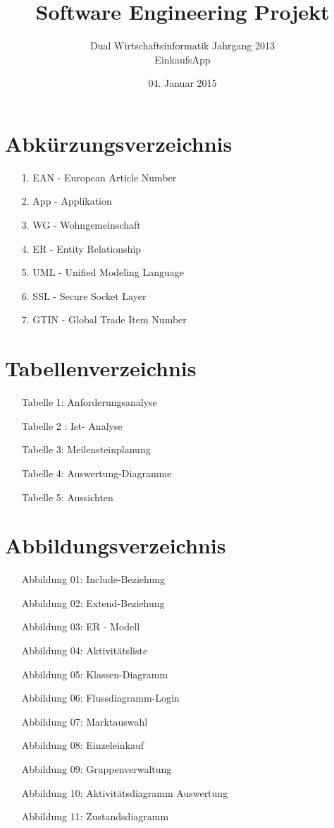 \documentclass[12pt,a4paper]{article}
\begin{document}
\title{Software Engineering Projekt}
\author{Dual Wirtschaftsinformatik Jahrgang 2013 \\ EinkaufsApp}
\date {04. Januar 2015}
\maketitle
\newpage
\tableofcontents
\newpage
\newpage
\section*{Abkürzungsverzeichnis}
\begin{itemize}
\item[1.] EAN - European Article Number
\item[2.] App - Applikation
\item[3.] WG - Wohngemeinschaft
\item[4.] ER - Entity Relationship
\item[5.] UML  - Unified Modeling Language
\item[6.] SSL - Secure Socket Layer 
\item[7.] GTIN - Global Trade Item Number
\end{itemize}
\newpage
\section*{Tabellenverzeichnis}
\begin{itemize}
\item[] Tabelle 1: Anforderungsanalyse
\item[] Tabelle 2 : Ist- Analyse
\item[] Tabelle 3: Meilensteinplanung
\item[] Tabelle 4: Auswertung-Diagramme
\item[] Tabelle 5: Aussichten
\end{itemize}
\newpage
\section*{Abbildungsverzeichnis}
\begin{itemize}
\item[] Abbildung 01: Include-Beziehung
\item[] Abbildung 02: Extend-Beziehung
\item[] Abbildung 03: ER - Modell
\item[] Abbildung 04: Aktivitätsliste
\item[] Abbildung 05: Klassen-Diagramm
\item[] Abbildung 06: Flussdiagramm-Login
\item[] Abbildung 07: Marktauswahl
\item[] Abbildung 08: Einzeleinkauf
\item[] Abbildung 09: Gruppenverwaltung
\item[] Abbildung 10: Aktivitätsdiagramm Auswertung
\item[] Abbildung 11: Zustandsdiagramm
\end{itemize}
\newpage
\end{document}
